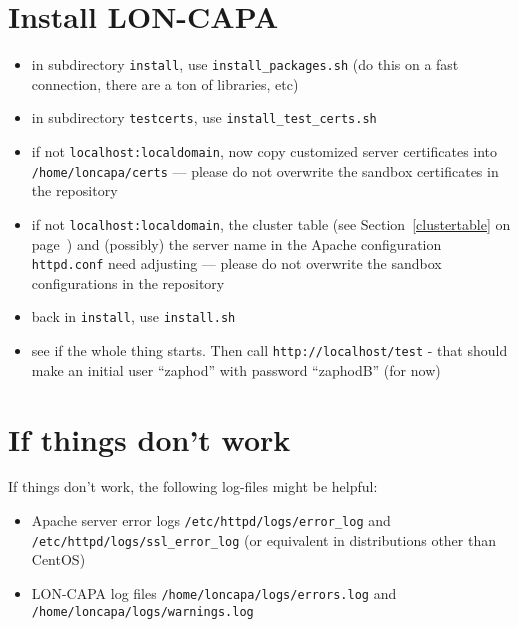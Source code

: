\section{Install LON-CAPA}
\begin{itemize}
\item in subdirectory {\tt install}, use {\tt install\_packages.sh} (do this on a fast connection, there are a ton of libraries, etc)
\item in subdirectory {\tt testcerts}, use {\tt install\_test\_certs.sh}
\item if not {\tt localhost:localdomain}, now copy customized server certificates into {\tt /home/loncapa/certs} --- please do not overwrite the sandbox certificates in the repository
\item if not {\tt localhost:localdomain}, the cluster table (see Section~\ref{clustertable} on page~\pageref{clustertable}) and (possibly) the server name in the Apache configuration {\tt httpd.conf} need adjusting --- please do not overwrite the sandbox configurations in the repository
\item back in {\tt install}, use {\tt install.sh}
\item see if the whole thing starts. Then call {\tt http://localhost/test} - that should make an initial user ``zaphod'' with password ``zaphodB'' (for now)
\end{itemize}
\section{If things don't work}
If things don't work, the following log-files might be helpful:
\begin{itemize}
\item Apache server error logs {\tt /etc/httpd/logs/error\_log} and {\tt /etc/httpd/logs/ssl\_error\_log} (or equivalent in distributions other than CentOS)
\item LON-CAPA log files {\tt /home/loncapa/logs/errors.log} and {\tt /home/loncapa/logs/warnings.log}
\end{itemize}
